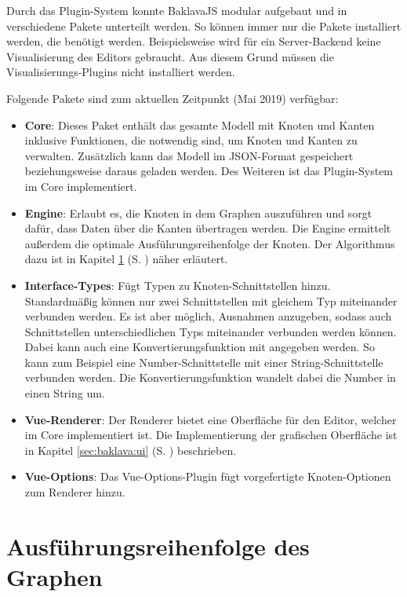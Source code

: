 Durch das Plugin-System konnte BaklavaJS modular aufgebaut und in verschiedene Pakete unterteilt werden. So können immer nur die Pakete installiert werden, die benötigt werden. Beispielsweise wird für ein Server-Backend keine Visualisierung des Editors gebraucht. Aus diesem Grund müssen die Visualisierungs-Plugins nicht installiert werden.

Folgende Pakete sind zum aktuellen Zeitpunkt (Mai 2019) verfügbar:

\begin{itemize}
    \item \textbf{Core}: Dieses Paket enthält das gesamte Modell mit Knoten und Kanten inklusive Funktionen, die notwendig sind, um Knoten und Kanten zu verwalten. Zusätzlich kann das Modell im JSON-Format gespeichert beziehungsweise daraus geladen werden. Des Weiteren ist das Plugin-System im Core implementiert.
    \item \textbf{Engine}: Erlaubt es, die Knoten in dem Graphen auszuführen und sorgt dafür, dass Daten über die Kanten übertragen werden. Die Engine ermittelt außerdem die optimale Ausführungsreihenfolge der Knoten. Der Algorithmus dazu ist in Kapitel \ref{sec:baklava:execution_order} (S. \pageref{sec:baklava:execution_order}) näher erläutert.
    \item \textbf{Interface-Types}: Fügt Typen zu Knoten-Schnittstellen hinzu. Standardmäßig können nur zwei Schnittstellen mit gleichem Typ miteinander verbunden werden. Es ist aber möglich, Ausnahmen anzugeben, sodass auch Schnittstellen unterschiedlichen Typs miteinander verbunden werden können. Dabei kann auch eine Konvertierungsfunktion mit angegeben werden. So kann zum Beispiel eine Number-Schnittstelle mit einer String-Schnittstelle verbunden werden. Die Konvertierungsfunktion wandelt dabei die Number in einen String um. 
    \item \textbf{Vue-Renderer}: Der Renderer bietet eine Oberfläche für den Editor, welcher im Core implementiert ist. Die Implementierung der grafischen Oberfläche ist in Kapitel \ref{sec:baklava:ui} (S. \pageref{sec:baklava:ui}) beschrieben.
    \item \textbf{Vue-Options}: Das Vue-Options-Plugin fügt vorgefertigte Knoten-Optionen zum Renderer hinzu.
\end{itemize}

\section{Ausführungsreihenfolge des Graphen}
\label{sec:baklava:execution_order}


